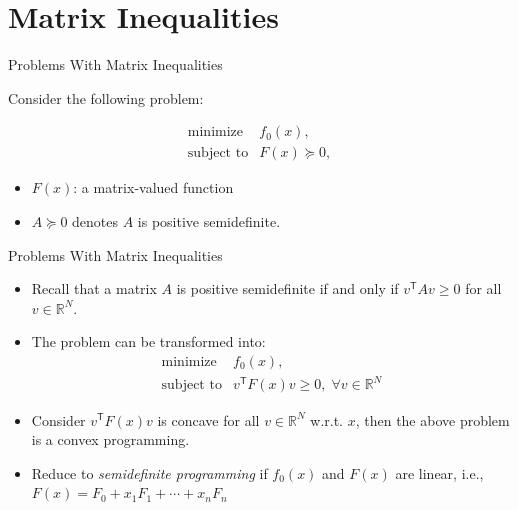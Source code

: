 \documentclass[10pt,ignorenonframetext,serif,onlymath]{beamer}
\providecommand{\tightlist}{%
  \setlength{\itemsep}{0pt}\setlength{\parskip}{0pt}}
\begin{document}
\hypertarget{sec:matrix-inequalities}{%
\section{Matrix Inequalities}\label{sec:matrix-inequalities}}

\begin{frame}{Problems With Matrix Inequalities}
\protect\hypertarget{sec:problems-with-matrix-inequalities}{}

Consider the following problem:

\[\begin{array}{ll}
    \text{minimize}    & f_0(x), \\
    \text{subject to}  & F(x) \succeq 0,
\end{array}\]

\begin{itemize}
\tightlist
\item
  \(F(x)\): a matrix-valued function
\item
  \(A \succeq 0\) denotes \(A\) is positive semidefinite.
\end{itemize}

\end{frame}

\begin{frame}{Problems With Matrix Inequalities}
\protect\hypertarget{sec:problems-with-matrix-inequalities-1}{}

\begin{itemize}
\tightlist
\item
  Recall that a matrix \(A\) is positive semidefinite if and only if
  \(v^\mathsf{T} A v \ge 0\) for all \(v \in \mathbb{R}^N\).
\item
  The problem can be transformed into: \[\begin{array}{ll}
            \text{minimize}      & f_0(x), \\
            \text{subject to}    & v^\mathsf{T} F(x) v \ge 0, \; \forall v \in \mathbb{R}^N
    \end{array}\]
\item
  Consider \(v^\mathsf{T} F(x) v\) is concave for all \(v \in \mathbb{R}^N\)
  w.r.t. \(x\), then the above problem is a convex programming.
\item
  Reduce to \emph{semidefinite programming} if \(f_0(x)\) and \(F(x)\)
  are linear, i.e., \(F(x) = F_0 + x_1 F_1 + \cdots + x_n F_n\)
\end{itemize}

\end{frame}
\end{document}
